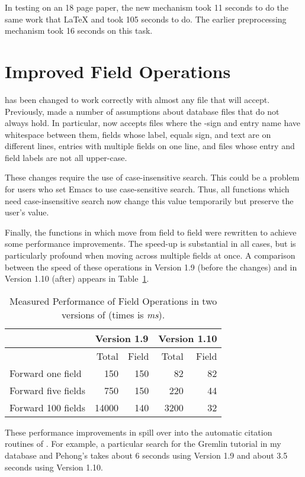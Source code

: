 In testing on an 18 page paper, the new mechanism took 11 seconds to
do the same work that {\LaTeX} and {\BibTeX} took 105 seconds to do.  The
earlier preprocessing mechanism took 16 seconds on this task.

\section{Improved Field Operations}

{\BM} has been changed to work correctly with almost any file
that {\BibTeX} will accept.  Previously, {\BM} made a number of
assumptions about database files that do not always hold.  In
particular, {\BM} now accepts files where the \@-sign and entry
name have whitespace between them, fields whose label, equals sign,
and text are on different lines, entries with multiple fields on one
line, and files whose entry and field labels are not all upper-case.

These changes require the use of case-insensitive search.  This could
be a problem for users who set Emacs to use case-sensitive search.
Thus, all {\BM} functions which need case-insensitive search now
change this value temporarily but preserve the user's value.

Finally, the functions in {\BM} which move from field to field were
rewritten to achieve some performance improvements.  The speed-up is
substantial in all cases, but is particularly profound when moving
across multiple fields at once.  A comparison between the speed of
these operations in Version 1.9 (before the changes) and in Version
1.10 (after) appears in Table~\ref{fieldops}.
\begin{table}
\begin{center}
\begin{tabular}{|l|r|r|r|r|} \hline
&\multicolumn{2}{|c|}{ Version 1.9} & \multicolumn{2}{|c|}{Version
1.10}\\ \hline
& Total& Field&Total&	  Field \\ \hline
Forward one field & 150 & 150 & 82 & 82 \\
Forward five fields & 750 & 150 & 220 & 44 \\
Forward 100 fields & 14000 & 140 & 3200 & 32 \\ \hline
\end{tabular}
\caption{Measured Performance of Field Operations in two versions of
{\BM} (times is {\em ms}).}
\label{fieldops}
\end{center}
\end{table}

These performance improvements in {\BM} spill over into the
automatic citation routines of {\TM}.  For example, a particular search for 
the Gremlin tutorial in my database and Pehong's takes about 6 seconds
using Version 1.9 and about 3.5 seconds using Version 1.10.


